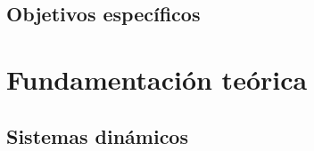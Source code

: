 \documentclass[12pt,a4paper]{report}
\begin{document}
%
%
%
%
%


\section{Objetivos específicos}

%
%
%
%
%
%
%



\chapter{Fundamentación teórica}

%
%


\section{Sistemas dinámicos}

%
%
%
%
\end{document}

